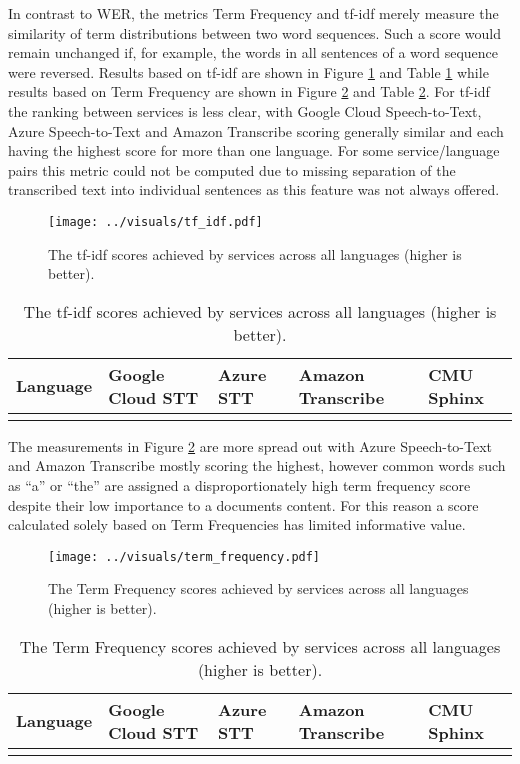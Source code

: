 \documentclass[11pt]{article}
\begin{document}
In contrast to WER, the metrics Term Frequency and tf-idf merely measure the similarity of term distributions between two word sequences. 
Such a score would remain unchanged if, for example, the words in all sentences of a word sequence were reversed.
Results based on tf-idf are shown in Figure \ref{fig:tf_idf} and Table \ref{tbl:tf_idf} while results based on Term Frequency are shown in Figure \ref{fig:term_frequency} and Table \ref{tbl:term_frequency}.
For tf-idf the ranking between services is less clear, with Google Cloud Speech-to-Text, Azure Speech-to-Text and Amazon Transcribe scoring generally similar and each having the highest score for more than one language.
For some service/language pairs this metric could not be computed due to missing separation of the transcribed text into individual sentences as this feature was not always offered.
\begin{figure}[!ht]
	\centering
	\texttt{[image: ../visuals/tf\_idf.pdf]}
	\vspace{-7mm}
	\caption{The tf-idf scores achieved by services across all languages (higher is better).}
	\label{fig:tf_idf}
\end{figure}
\begin{table}[!ht]
	\centering
	\begin{tabular}{l>{\Centering}m{20mm}>{\Centering}m{20mm}>{\Centering}m{20mm}>{\Centering}m{20mm}}
		\toprule
		Language & Google Cloud STT & Azure STT & Amazon Transcribe & CMU Sphinx \\
		\midrule
		\tfidfTbl
		\bottomrule
	\end{tabular}
	\caption{The tf-idf scores achieved by services across all languages (higher is better).}
  \label{tbl:tf_idf}
\end{table}

The measurements in Figure \ref{fig:term_frequency} are more spread out with Azure Speech-to-Text and Amazon Transcribe mostly scoring the highest, however common words such as ``a'' or ``the'' are assigned a disproportionately high term frequency score despite their low importance to a documents content.
For this reason a score calculated solely based on Term Frequencies has limited informative value.
\begin{figure}[!ht]
	\centering
	\texttt{[image: ../visuals/term\_frequency.pdf]}
	\vspace{-7mm}
	\caption{The Term Frequency scores achieved by services across all languages (higher is better).}
	\label{fig:term_frequency}
\end{figure}
\begin{table}[!ht]
	\centering
	\begin{tabular}{l>{\Centering}m{20mm}>{\Centering}m{20mm}>{\Centering}m{20mm}>{\Centering}m{20mm}}
		\toprule
		Language & Google Cloud STT & Azure STT & Amazon Transcribe & CMU Sphinx \\
		\midrule
		\tfTbl
		\bottomrule
	\end{tabular}
	\caption{The Term Frequency scores achieved by services across all languages (higher is better).}
  \label{tbl:term_frequency}
\end{table}
\end{document}
